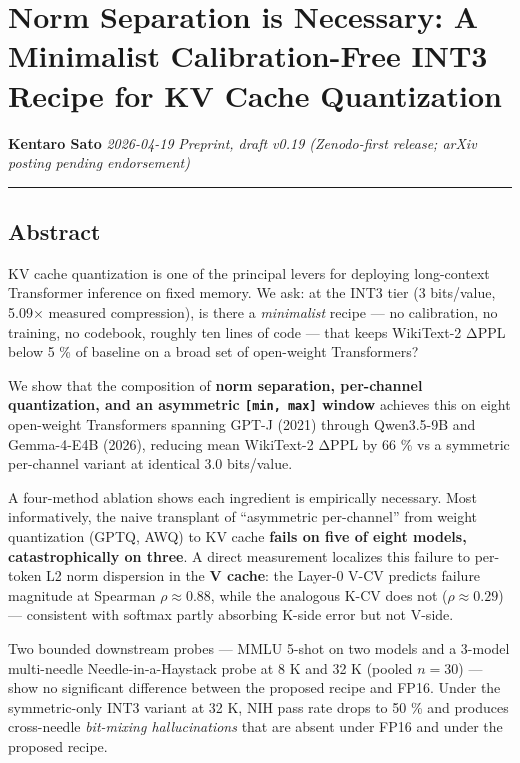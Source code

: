 \documentclass[
]{article}
\author{}
\date{}
\begin{document}
\section{Norm Separation is Necessary: A Minimalist Calibration-Free
INT3 Recipe for KV Cache
Quantization}\label{norm-separation-is-necessary-a-minimalist-calibration-free-int3-recipe-for-kv-cache-quantization}

\textbf{Kentaro Sato} \emph{2026-04-19} \emph{Preprint, draft v0.19
(Zenodo-first release; arXiv posting pending endorsement)}

\begin{center}\rule{0.5\linewidth}{0.5pt}\end{center}

\subsection{Abstract}\label{abstract}

KV cache quantization is one of the principal levers for deploying
long-context Transformer inference on fixed memory. We ask: at the INT3
tier (3 bits/value, 5.09× measured compression), is there a
\emph{minimalist} recipe --- no calibration, no training, no codebook,
roughly ten lines of code --- that keeps WikiText-2 ΔPPL below 5 \% of
baseline on a broad set of open-weight Transformers?

We show that the composition of \textbf{norm separation, per-channel
quantization, and an asymmetric \texttt{{[}min,\ max{]}} window}
achieves this on eight open-weight Transformers spanning GPT-J (2021)
through Qwen3.5-9B and Gemma-4-E4B (2026), reducing mean WikiText-2 ΔPPL
by 66 \% vs a symmetric per-channel variant at identical 3.0 bits/value.

A four-method ablation shows each ingredient is empirically necessary.
Most informatively, the naive transplant of ``asymmetric per-channel''
from weight quantization (GPTQ, AWQ) to KV cache \textbf{fails on five
of eight models, catastrophically on three}. A direct measurement
localizes this failure to per-token L2 norm dispersion in the \textbf{V
cache}: the Layer-0 V-CV predicts failure magnitude at Spearman
\(\rho \approx 0.88\), while the analogous K-CV does not
(\(\rho \approx 0.29\)) --- consistent with softmax partly absorbing
K-side error but not V-side.

Two bounded downstream probes --- MMLU 5-shot on two models and a
3-model multi-needle Needle-in-a-Haystack probe at 8 K and 32 K (pooled
\(n = 30\)) --- show no significant difference between the proposed
recipe and FP16. Under the symmetric-only INT3 variant at 32 K, NIH pass
rate drops to 50 \% and produces cross-needle \emph{bit-mixing
hallucinations} that are absent under FP16 and under the proposed
recipe.
\end{document}

